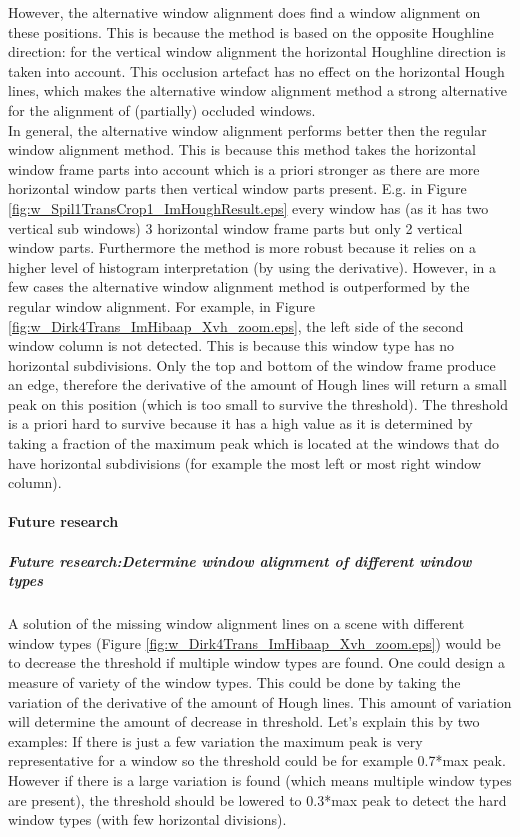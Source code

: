 However, the alternative window alignment does find a window alignment on these
positions. This is because the method is based on the opposite Houghline
direction: for the vertical window alignment the horizontal Houghline direction
is taken into account.  This occlusion artefact has no effect on the horizontal
Hough lines, which makes the alternative window alignment method a strong
alternative for the alignment of (partially) occluded windows.\\

In general, the alternative window alignment performs better then the regular
window alignment method.  This is because this method takes the  horizontal
window frame parts into account which is a priori stronger as there are more
horizontal window parts then vertical window parts present.  E.g. in Figure
\ref{fig:w_Spil1TransCrop1_ImHoughResult.eps} every window has (as it has two
vertical sub windows) 3 horizontal window frame parts but only 2 vertical window
parts.  Furthermore the method is more robust because it relies on a higher
level of histogram interpretation (by using the derivative).  However, in a few
cases the alternative window alignment method is outperformed by the regular window
alignment. For example, in Figure
\ref{fig:w_Dirk4Trans_ImHibaap_Xvh_zoom.eps}, the left
side of the second window column is not detected.
This is because this window type has no horizontal subdivisions. Only the top and
bottom of the window frame produce an edge, therefore the derivative of the
amount of Hough lines will return a small peak on this position (which is too
small to survive the threshold).  
The threshold is a priori hard to survive because it has a high value as it is
determined by taking a fraction of the maximum peak which is located at the
windows that do have horizontal subdivisions (for example the most left or most
right window column). 





\paragraph{Future research}
\subparagraph{Future research:Determine window alignment of different window types}
A solution of the missing window alignment lines on a scene with different
window types (Figure \ref{fig:w_Dirk4Trans_ImHibaap_Xvh_zoom.eps}) would be to
decrease the threshold if multiple window types are found. One could design a
measure of variety of the window types. This could be done by taking the variation of the
derivative of the amount of Hough lines. This amount of variation will determine
the amount of decrease in threshold. Let's explain this by two examples:
If there is just a few variation the maximum peak is very representative for a
window so the threshold could be for example 0.7*max peak. However if there is a
large variation is found (which means multiple window types are present), the
threshold should be lowered to 0.3*max peak to detect the hard window types
(with few horizontal divisions).\\

